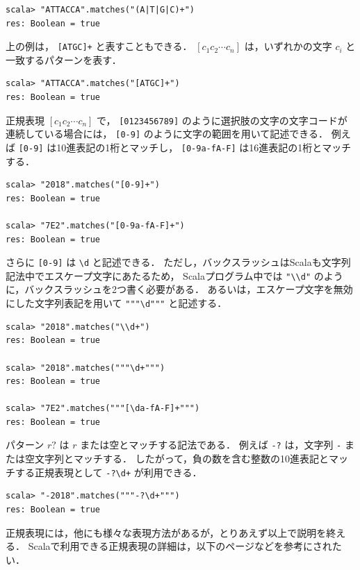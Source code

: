 \documentclass[a4j]{jsarticle}
\begin{document}
\begin{verbatim}
scala> "ATTACCA".matches("(A|T|G|C)+")
res: Boolean = true
\end{verbatim}

上の例は， \texttt{[ATGC]+} と表すこともできる．
$[c_1c_2\cdots c_n]$ は，いずれかの文字 $c_i$ と一致するパターンを表す．

\begin{verbatim}
scala> "ATTACCA".matches("[ATGC]+")
res: Boolean = true
\end{verbatim}

正規表現 $[c_1c_2\cdots c_n]$ で，
\texttt{[0123456789]} のように選択肢の文字の文字コードが連続している場合には，
\texttt{[0-9]} のように文字の範囲を用いて記述できる．
例えば \texttt{[0-9]} は10進表記の1桁とマッチし， \texttt{[0-9a-fA-F]} は16進表記の1桁とマッチする．

\begin{verbatim}
scala> "2018".matches("[0-9]+")
res: Boolean = true

scala> "7E2".matches("[0-9a-fA-F]+")
res: Boolean = true
\end{verbatim}

さらに \texttt{[0-9]} は \texttt{\textbackslash{}d} と記述できる．
ただし，バックスラッシュはScalaも文字列記法中でエスケープ文字にあたるため，
Scalaプログラム中では \texttt{"\textbackslash{}\textbackslash{}d"} のように，バックスラッシュを2つ書く必要がある．
あるいは，エスケープ文字を無効にした文字列表記を用いて \texttt{"""\textbackslash{}d"""} と記述する．

\begin{verbatim}
scala> "2018".matches("\\d+")
res: Boolean = true

scala> "2018".matches("""\d+""")
res: Boolean = true

scala> "7E2".matches("""[\da-fA-F]+""")
res: Boolean = true
\end{verbatim}

パターン $r?$ は $r$ または空とマッチする記法である．
例えば \texttt{-?} は，文字列 \texttt{-} または空文字列とマッチする．
したがって，負の数を含む整数の10進表記とマッチする正規表現として \texttt{-?\textbackslash{}d+} が利用できる．

\begin{verbatim}
scala> "-2018".matches("""-?\d+""")
res: Boolean = true
\end{verbatim}

正規表現には，他にも様々な表現方法があるが，とりあえず以上で説明を終える．
Scalaで利用できる正規表現の詳細は，以下のページなどを参考にされたい．
\end{document}
